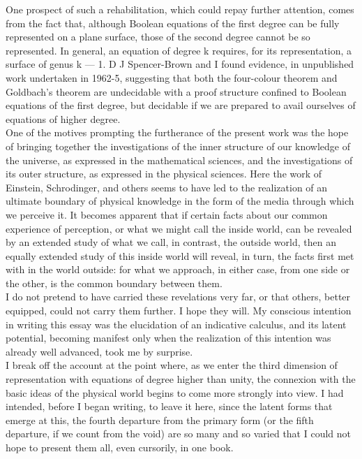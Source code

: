 \documentclass[a4paper]{article}
\theoremstyle{remark}
\begin{document}
One  prospect   of  such  a  rehabilitation,   which  could   repay   further  attention,  comes  from  the  fact  that,  although  Boolean  equations  of  the  first  degree can  be  fully  represented  on  a  plane  surface,  those  of  the  second  degree  cannot  be  so  represented.  In  general,  an  equation  of  degree  k  requires,  for  its  representation,  a  surface  of  genus  k — 1.  D J Spencer-Brown  and  I  found  evidence, in unpublished  work  undertaken  in  1962-5, suggesting that  both  the  four-colour  theorem  and  Goldbach's  theorem  are  undecidable with a proof structure confined to Boolean equations of  the  first  degree,  but  decidable  if  we  are  prepared  to  avail  ourselves  of  equations  of  higher  degree. \\

One  of  the  motives  prompting  the  furtherance  of  the  present  work  was the hope  of bringing together the  investigations  of  the  inner  structure  of  our  knowledge  of  the  universe,  as  expressed  in   the   mathematical   sciences,   and   the   investigations   of   its   outer  structure,  as  expressed  in  the  physical  sciences.  Here  the  work  of  Einstein,  Schrodinger,  and  others  seems  to  have  led  to the realization  of an ultimate boundary  of physical  knowledge  in  the  form   of  the  media  through  which   we  perceive   it.   It   becomes   apparent   that   if   certain   facts   about   our   common   experience   of  perception,   or  what   we  might   call   the   inside   world,  can  be  revealed  by  an  extended  study  of  what  we  call,  in  contrast,  the  outside  world,  then  an  equally  extended  study  of  this  inside  world  will  reveal,  in  turn,  the  facts  first  met  with  in the world  outside: for  what  we approach,  in either  case,  from  one  side  or  the  other,  is  the  common  boundary  between  them. \\

I  do  not  pretend  to  have  carried  these  revelations  very  far, or  that  others,  better  equipped,  could  not  carry  them   further.   I  hope  they  will.  My  conscious  intention  in  writing  this  essay  was  the  elucidation   of  an  indicative  calculus,  and   its   latent   potential,  becoming  manifest  only  when  the  realization  of  this  intention  was  already  well  advanced,  took  me  by  surprise. \\

I break  off  the  account  at  the  point  where,  as  we  enter  the  third   dimension   of   representation   with  equations   of   degree   higher  than  unity,  the  connexion  with  the  basic  ideas  of  the  physical  world  begins  to  come  more  strongly  into  view.  I  had  intended,   before   I  began  writing,  to   leave  it  here,  since  the  latent  forms  that  emerge  at  this,  the  fourth  departure  from  the  primary   form   (or   the  fifth   departure,   if  we  count   from   the   void) are so many and  so varied that  I could  not hope to  present  them  all,  even  cursorily,  in  one  book.\\
\end{document}
